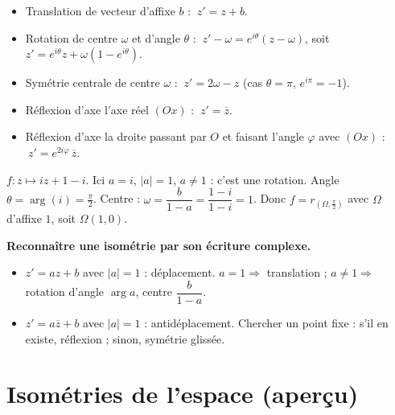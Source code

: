 \begin{propriete}
\begin{itemize}
\item Translation de vecteur d'affixe $b$ : $\ z'=z+b$.
\item Rotation de centre $\omega$ et d'angle $\theta$ : $\ z'-\omega=e^{i\theta}(z-\omega)$, soit $z'=e^{i\theta}z+\omega(1-e^{i\theta})$.
\item Symétrie centrale de centre $\omega$ : $\ z'=2\omega-z$ (cas $\theta=\pi$, $e^{i\pi}=-1$).
\item Réflexion d'axe l'axe réel $(Ox)$ : $\ z'=\overline z$.
\item Réflexion d'axe la droite passant par $O$ et faisant l'angle $\varphi$ avec $(Ox)$ : $\ z'=e^{2i\varphi}\,\overline z$.
\end{itemize}
\end{propriete}

\begin{exemple}
$f:z\mapsto iz+1-i$. Ici $a=i$, $|a|=1$, $a\neq1$ : c'est une rotation. Angle $\theta=\arg(i)=\frac\pi2$. Centre : $\omega=\dfrac{b}{1-a}=\dfrac{1-i}{1-i}=1$. Donc $f=r_{(\Omega,\frac\pi2)}$ avec $\Omega$ d'affixe $1$, soit $\Omega(1,0)$.
\end{exemple}

\begin{aretenir}
\textbf{Reconnaître une isométrie par son écriture complexe.}
\begin{itemize}
\item $z'=az+b$ avec $|a|=1$ : déplacement. $a=1\Rightarrow$ translation ; $a\neq1\Rightarrow$ rotation d'angle $\arg a$, centre $\dfrac{b}{1-a}$.
\item $z'=a\overline z+b$ avec $|a|=1$ : antidéplacement. Chercher un point fixe : s'il en existe, réflexion ; sinon, symétrie glissée.
\end{itemize}
\end{aretenir}

\section{Isométries de l'espace (aperçu)}

